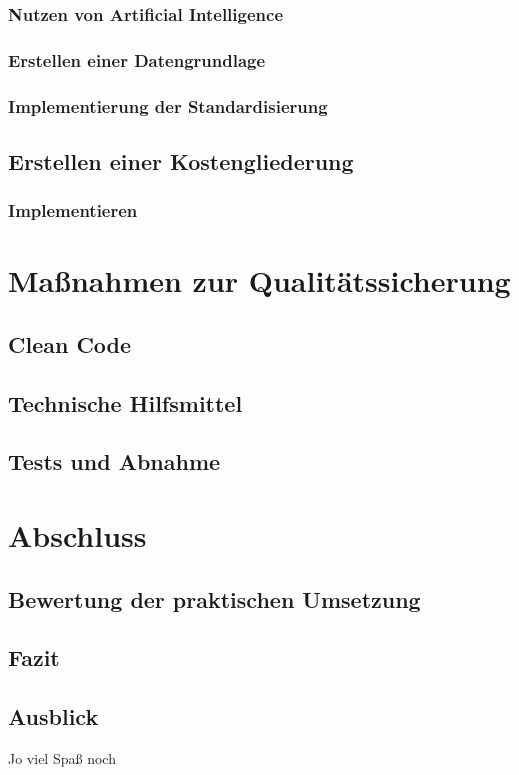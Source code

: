 \subsubsection{Nutzen von Artificial Intelligence}

\subsubsection{Erstellen einer Datengrundlage}
\subsubsection{Implementierung der Standardisierung}

\subsection{Erstellen einer Kostengliederung}
\subsubsection{Implementieren}

\section{Maßnahmen zur Qualitätssicherung}
\subsection{Clean Code}
\subsection{Technische Hilfsmittel}
\subsection{Tests und Abnahme}

\section{Abschluss}
\subsection{Bewertung der praktischen Umsetzung}
\subsection{Fazit}
\subsection{Ausblick}
 Jo viel Spaß noch
